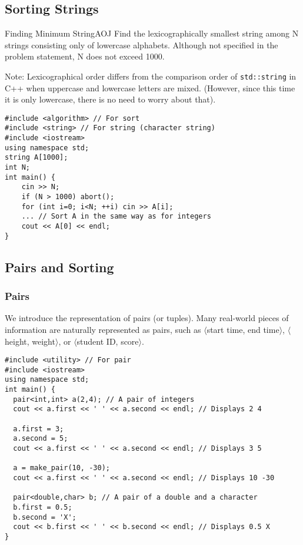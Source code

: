\subsection{Sorting Strings}

\begin{psbox}{Finding Minimum String}{AOJ}
Find the lexicographically smallest string among N strings consisting only of lowercase alphabets.
Although not specified in the problem statement, N does not exceed 1000.

\end{psbox}

Note: Lexicographical order differs from the comparison order of \texttt{std::string} in C++ when uppercase and lowercase letters are mixed. (However, since this time it is only lowercase, there is no need to worry about that).

\begin{cbox}
\begin{verbatim}
#include <algorithm> // For sort
#include <string> // For string (character string)
#include <iostream>
using namespace std;
string A[1000];
int N;
int main() {
    cin >> N;
    if (N > 1000) abort();
    for (int i=0; i<N; ++i) cin >> A[i];
    ... // Sort A in the same way as for integers
    cout << A[0] << endl;
}
\end{verbatim}
\end{cbox}
\subsection{Pairs and Sorting}\label{section:sort-pairs}
\subsubsection{Pairs}
We introduce the representation of pairs (or tuples). Many real-world pieces of information are naturally represented as pairs, such as $\langle$start time, end time$\rangle$, $\langle$height, weight$\rangle$, or $\langle$student ID, score$\rangle$.

\begin{cbox}
\begin{verbatim}
#include <utility> // For pair
#include <iostream>
using namespace std;
int main() {
  pair<int,int> a(2,4); // A pair of integers
  cout << a.first << ' ' << a.second << endl; // Displays 2 4

  a.first = 3;
  a.second = 5;
  cout << a.first << ' ' << a.second << endl; // Displays 3 5

  a = make_pair(10, -30);
  cout << a.first << ' ' << a.second << endl; // Displays 10 -30

  pair<double,char> b; // A pair of a double and a character
  b.first = 0.5;
  b.second = 'X';
  cout << b.first << ' ' << b.second << endl; // Displays 0.5 X
}
\end{verbatim}
\end{cbox}

